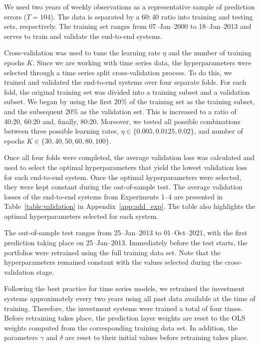 \documentclass[10pt, twocolumn]{article}
\theoremstyle{plain}
\theoremstyle{definition}
\begin{document}
We used two years of weekly observations as a representative sample of 
prediction errors (\(T=104\)). The data is separated by a \(60:40\) 
ratio into training and testing sets, respectively. The training set 
ranges from 07--Jan--2000 to 18--Jan--2013 and serves to train and 
validate the end-to-end systems.  

Cross-validation was used to tune the learning rate \(\eta\) and the number 
of training epochs \(K\). Since we are working 
with time series data, the hyperparameters were selected through a time 
series split cross-validation process. To do this, we trained and validated 
the end-to-end systems over four separate folds. For each fold, the 
original training set was divided into a training subset and a validation 
subset. We began by using the first 20\% of the training set as the 
training subset, and the subsequent 20\% as the validation set. This is 
increased to a ratio of 40:20, 60:20 and, finally, 80:20. Moreover, we 
tested all possible combinations between three possible learning rates, 
\(\eta\in\{0.005, 0.0125, 0.02\}\), and number of epochs 
\(K\in\{30, 40, 50, 60, 80, 100\}\).  
 
Once all four folds were completed, the average validation loss was 
calculated and used to select the optimal hyperparameters that yield 
the lowest validation loss for each end-to-end system. Once the optimal
hyperparameters were selected, they were kept constant during the 
out-of-sample test. The average validation losses of the end-to-end 
systems from Experiments 1--4 are presented in Table~\ref{table:validation} 
in Appendix~\ref{app:add_exp}. The table also highlights the optimal 
hyperparameters selected for each system. 

The out-of-sample test ranges from 25--Jan--2013 to 
01--Oct--2021, with the first prediction taking place on 25--Jan--2013. 
Immediately before the test starts, the portfolios were retrained using 
the full training data set. Note that the hyperparameters remained constant 
with the values selected during the cross-validation stage. 

Following the best practice for time series models, we retrained the
investment systems approximately every two years using all past data 
available at the time of training. Therefore, the investment systems 
were trained a total of four times. Before retraining takes place, 
the prediction layer weights are reset to the OLS weights computed from
the corresponding training data set. In addition, the parameters \(\gamma\) 
and \(\delta\) are reset to their initial values before retraining takes place.
\end{document}
